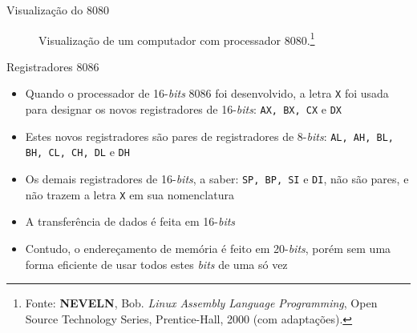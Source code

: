 \begin{frame}[fragile]{Visualização do 8080}
\begin{figure}[ht]
        \caption{Visualização de um computador com processador 8080.\footnote{Fonte: \textbf{NEVELN}, Bob. \textit{Linux Assembly Language Programming}, Open Source Technology Series, Prentice-Hall, 2000 (com adaptações).}}
    \end{figure}

\end{frame}

\begin{frame}[fragile]{Registradores 8086}

    \begin{itemize}
        \item Quando o processador de 16-\textit{bits} 8086 foi desenvolvido, a letra \texttt{X} 
            foi usada para designar os novos registradores de 16-\textit{bits}: \texttt{AX, BX, CX}
            e \texttt{DX}

        \item Estes novos registradores são pares de registradores de 8-\textit{bits}: \texttt{AL, 
            AH, BL, BH, CL, CH, DL} e \texttt{DH}

        \item Os demais registradores de 16-\textit{bits}, a saber: \texttt{SP, BP, SI} e 
            \texttt{DI}, não são pares, e não trazem a letra \texttt{X} em sua nomenclatura

        \item A transferência de dados é feita em 16-\textit{bits}

        \item Contudo, o endereçamento de memória é feito em 20-\textit{bits}, porém sem uma
            forma eficiente de usar todos estes \textit{bits} de uma só vez
    \end{itemize}

\end{frame}

